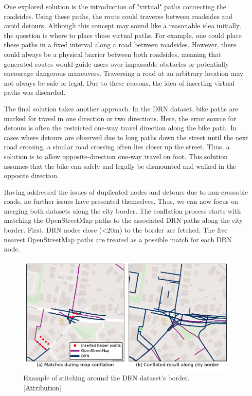 One explored solution is the introduction of "virtual" paths connecting the roadsides. Using these paths, the route could traverse between roadsides and avoid detours. Although this concept may sound like a reasonable idea initially, the question is where to place these virtual paths. For example, one could place these paths in a fixed interval along a road between roadsides. However, there could always be a physical barrier between both roadsides, meaning that generated routes would guide users over impassable obstacles or potentially encourage dangerous maneuvers. Traversing a road at an arbitrary location may not always be safe or legal. Due to these reasons, the idea of inserting virtual paths was discarded.

The final solution takes another approach. In the DRN dataset, bike paths are marked for travel in one direction or two directions. Here, the error source for detours is often the restricted one-way travel direction along the bike path. In cases where detours are observed due to long paths down the street until the next road crossing, a similar road crossing often lies closer up the street. Thus, a solution is to allow opposite-direction one-way travel on foot. This solution assumes that the bike can safely and legally be dismounted and walked in the opposite direction.

Having addressed the issues of duplicated nodes and detours due to non-crossable roads, no further issues have presented themselves. Thus, we can now focus on merging both datasets along the city border. The conflation process starts with matching the OpenStreetMap paths to the associated DRN paths along the city border. First, DRN nodes close (<20m) to the border are fetched. The five nearest OpenStreetMap paths are treated as a possible match for each DRN node. 

\begin{figure}[t]
\centering
\includegraphics[width=\linewidth]{images/routing-drn-osm-border.pdf}
\caption{Example of stitching around the DRN dataset's border. [\hyperref[attribution]{Attribution}]}
\label{fig:routing-drn-osm-border}
\end{figure}

